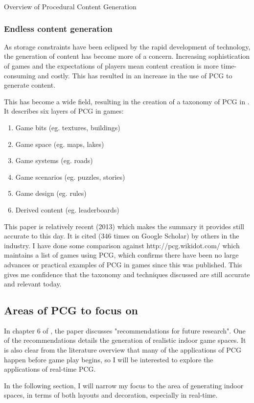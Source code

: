 \documentclass[review]{cmpreport}
\begin{document}
\begin{section}{Overview of Procedural Content Generation}
\subsubsection{Endless content generation}
As storage constraints have been eclipsed by the rapid development of technology, the generation of content has become more of a concern. Increasing sophistication of games and the expectations of players mean content creation is more time-consuming and costly. This has resulted in an increase in the use of PCG to generate content. \par
This has become a wide field, resulting in the creation of a taxonomy of PCG in \cite{Hendrikx:2013:PCG:2422956.2422957}. It describes six layers of PCG in games:
\begin{enumerate}
    \item Game bits (eg. textures, buildings)
    \item Game space (eg. maps, lakes)
    \item Game systems (eg. roads)
    \item Game scenarios (eg. puzzles, stories)
    \item Game design (eg. rules)
    \item Derived content (eg. leaderboards)
\end{enumerate}

This paper is relatively recent (2013) which makes the summary it provides still accurate to this day. It is cited (346 times on Google Scholar) by others in the industry. I have done some comparison against http://pcg.wikidot.com/ which maintains a list of games using PCG, which confirms there have been no large advances or practical examples of PCG in games since this was published. This gives me confidence that the taxonomy and techniques discussed are still accurate and relevant today. \par 

\subsection{Areas of PCG to focus on}
In chapter 6 of \cite{Hendrikx:2013:PCG:2422956.2422957}, the paper discusses "recommendations for future research". One of the recommendations details the generation of realistic indoor game spaces. It is also clear from the literature overview that many of the applications of PCG happen before game play begins, so I will be interested to explore the applications of real-time PCG. \par
In the following section, I will narrow my focus to the area of generating indoor spaces, in terms of both layouts and decoration, especially in real-time.

\end{section}
\end{document}
